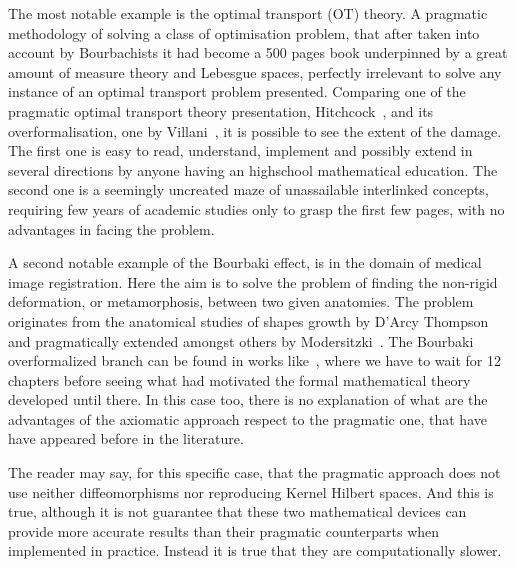 \documentclass[]{scrartcl}
\theoremstyle{definition}
\begin{document}
The most notable example is the optimal transport (OT) theory. A pragmatic methodology of solving a class of optimisation problem, that after taken into account by Bourbachists it had become a 500 pages book underpinned by a great amount of measure theory and Lebesgue spaces, perfectly irrelevant to solve any instance of an optimal transport problem presented. Comparing one of the pragmatic optimal transport theory presentation, Hitchcock~\cite{hitchcock1941distribution}, and its overformalisation, one by Villani~\cite{villani2003topics}, it is possible to see the extent of the damage. The first one is easy to read, understand, implement and possibly extend in several directions by anyone having an highschool mathematical education. The second one is a seemingly uncreated maze of unassailable interlinked concepts, requiring few years of academic studies only to grasp the first few pages, with no advantages in facing the problem. %

A second notable example of the Bourbaki effect, is in the domain of medical image registration. Here the aim is to solve the problem of finding the non-rigid deformation, or metamorphosis, between two given anatomies. The problem originates from the anatomical studies of shapes growth by D'Arcy Thompson~\cite{d1942growth} and pragmatically extended amongst others by Modersitzki~\cite{modersitzki2004numerical}. The Bourbaki overformalized branch can be found in works like~\cite{younes2010shapes}, where we have to wait for 12 chapters before seeing what had motivated the formal mathematical theory developed until there. 
In this case too, there is no explanation of what are the advantages of the axiomatic approach respect to the pragmatic one, that have have appeared before in the literature.

The reader may say, for this specific case, that the pragmatic approach \cite{modersitzki2004numerical} does not use neither diffeomorphisms nor reproducing Kernel Hilbert spaces. And this is true, although it is not guarantee that these two mathematical devices can provide more accurate results than their pragmatic counterparts when implemented in practice. Instead it is true that they are computationally slower.
\end{document}
